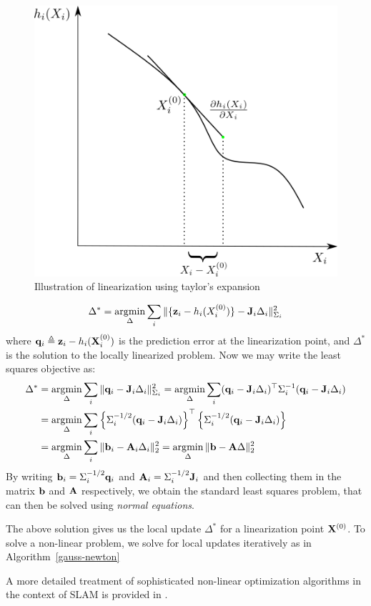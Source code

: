 \begin{figure}[htpb]
    \centering
    \includegraphics[width=0.5\linewidth]{figs/linearization}
    \caption{Illustration of linearization using taylor's expansion}
    \label{fig:taylor}
    \vspace{-1em}
\end{figure}
\begin{align}
    \Delta^* = \operatorname*{\arg\!\min}_{\Delta}\sum_{i} \| \{\mathbf{z}_i - h_i(X_i^{(0)})\} - \mathbf{J}_i \Delta_i \|_{\Sigma_i}^2
\end{align}
where $\mathbf{q}_i \triangleq \mathbf{z}_i - h_i(\mathbf{X}_i^{(0)})$ is the prediction error at the linearization point, and $\Delta^*$ is the solution to the locally linearized problem. Now we may write the least squares objective as:
\begin{align}
    \Delta^* &= \operatorname*{\arg\!\min}_{\Delta}\sum_{i} \| \mathbf{q}_i - \mathbf{J}_i \Delta_i \|_{\Sigma_i}^2 = \operatorname*{\arg\!\min}_{\Delta}\sum_{i} (\mathbf{q}_i - \mathbf{J}_i \Delta_i)^\top \Sigma_i^{-1} (\mathbf{q}_i - \mathbf{J}_i \Delta_i)\\
             &=  \operatorname*{\arg\!\min}_{\Delta}\sum_{i} \left\{\Sigma_i^{-1/2}(\mathbf{q}_i - \mathbf{J}_i \Delta_i)\right\}^\top \left\{ \Sigma_i^{-1/2} (\mathbf{q}_i - \mathbf{J}_i \Delta_i)\right\}\\
             &= \operatorname*{\arg\!\min}_{\Delta}\sum_{i} \| \mathbf{b}_i - \mathbf{A}_i \Delta_i \|_2^2 = \operatorname*{\arg\!\min}_{\Delta} \| \mathbf{b} - \mathbf{A} \Delta\|_2^2
\end{align}
By writing $\mathbf{b}_i = \Sigma_i^{-1/2} \mathbf{q}_i$ and $\mathbf{A}_i = \Sigma_i^{-1/2} \mathbf{J}_i$ and then collecting them in the matrix $\mathbf{b}$ and $\mathbf{A}$ respectively, we obtain the standard least squares problem, that can then be solved using \emph{normal equations}.

The above solution gives us the local update $\Delta^*$ for a linearization point $\mathbf{X}^{(0)}$. To solve a non-linear problem, we solve for local updates iteratively as in Algorithm~\ref{gauss-newton}


A more detailed treatment of sophisticated non-linear optimization algorithms in the context of SLAM is provided in \cite{dellaertFactorGraphsRobot2017}.

